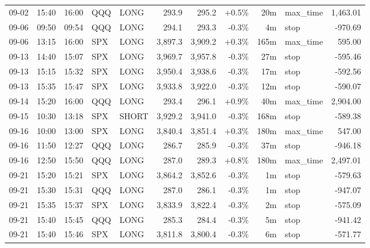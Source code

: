 \documentclass[11pt,a4paper,twoside]{article}
\begin{document}
\begin{center}
\begin{longtable}{>{\color{txtmain}}l l l l l r r r r >{\color{txtmain}}l r}
09-02 & 15:40 & 16:00 & QQQ & LONG & 293.9 & 295.2 & \textcolor{wingreen}{+0.5\%} & 20m & max\_time & \textcolor{wingreen}{1,463.01} \\
09-06 & 09:50 & 09:54 & QQQ & LONG & 294.1 & 293.3 & \textcolor{lossred}{-0.3\%} & 4m & stop & \textcolor{lossred}{-970.69} \\
09-06 & 13:15 & 16:00 & SPX & LONG & 3,897.3 & 3,909.2 & \textcolor{wingreen}{+0.3\%} & 165m & max\_time & \textcolor{wingreen}{595.00} \\
09-13 & 14:40 & 15:07 & SPX & LONG & 3,969.7 & 3,957.8 & \textcolor{lossred}{-0.3\%} & 27m & stop & \textcolor{lossred}{-595.46} \\
09-13 & 15:15 & 15:32 & SPX & LONG & 3,950.4 & 3,938.6 & \textcolor{lossred}{-0.3\%} & 17m & stop & \textcolor{lossred}{-592.56} \\
09-13 & 15:35 & 15:47 & SPX & LONG & 3,933.8 & 3,922.0 & \textcolor{lossred}{-0.3\%} & 12m & stop & \textcolor{lossred}{-590.07} \\
09-14 & 15:20 & 16:00 & QQQ & LONG & 293.4 & 296.1 & \textcolor{wingreen}{+0.9\%} & 40m & max\_time & \textcolor{wingreen}{2,904.00} \\
09-15 & 10:30 & 13:18 & SPX & SHORT & 3,929.2 & 3,941.0 & \textcolor{lossred}{-0.3\%} & 168m & stop & \textcolor{lossred}{-589.38} \\
09-16 & 10:00 & 13:00 & SPX & LONG & 3,840.4 & 3,851.4 & \textcolor{wingreen}{+0.3\%} & 180m & max\_time & \textcolor{wingreen}{547.00} \\
09-16 & 11:50 & 12:27 & QQQ & LONG & 286.7 & 285.9 & \textcolor{lossred}{-0.3\%} & 37m & stop & \textcolor{lossred}{-946.18} \\
09-16 & 12:50 & 15:50 & QQQ & LONG & 287.0 & 289.3 & \textcolor{wingreen}{+0.8\%} & 180m & max\_time & \textcolor{wingreen}{2,497.01} \\
09-21 & 15:20 & 15:21 & SPX & LONG & 3,864.2 & 3,852.6 & \textcolor{lossred}{-0.3\%} & 1m & stop & \textcolor{lossred}{-579.63} \\
09-21 & 15:30 & 15:31 & QQQ & LONG & 287.0 & 286.1 & \textcolor{lossred}{-0.3\%} & 1m & stop & \textcolor{lossred}{-947.07} \\
09-21 & 15:35 & 15:37 & SPX & LONG & 3,833.9 & 3,822.4 & \textcolor{lossred}{-0.3\%} & 2m & stop & \textcolor{lossred}{-575.09} \\
09-21 & 15:40 & 15:45 & QQQ & LONG & 285.3 & 284.4 & \textcolor{lossred}{-0.3\%} & 5m & stop & \textcolor{lossred}{-941.42} \\
09-21 & 15:40 & 15:46 & SPX & LONG & 3,811.8 & 3,800.4 & \textcolor{lossred}{-0.3\%} & 6m & stop & \textcolor{lossred}{-571.77} \\

\end{longtable}
\end{center}
\end{document}
